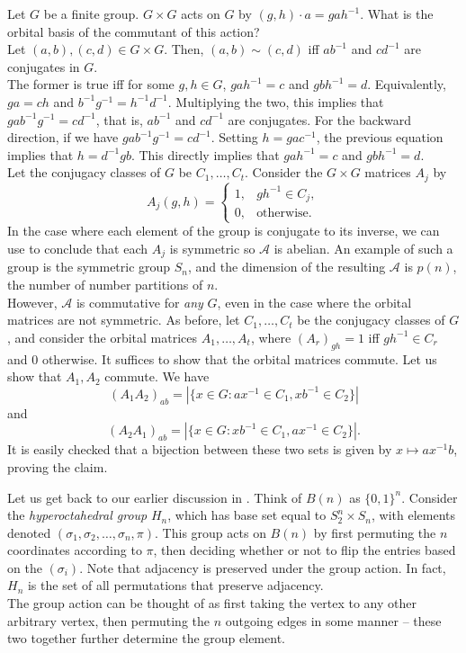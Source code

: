 	\begin{fex}
		Let $G$ be a finite group. $G \times G$ acts on $G$ by $(g,h) \cdot a = gah^{-1}$. What is the orbital basis of the commutant of this action?\\
		Let $(a,b),(c,d) \in G \times G$. Then, $(a,b) \sim (c,d)$ iff $ab^{-1}$ and $cd^{-1}$ are conjugates in $G$.\\
		The former is true iff for some $g,h \in G$, $gah^{-1} = c$ and $gbh^{-1} = d$. Equivalently, $ga = ch$ and $b^{-1}g^{-1} = h^{-1}d^{-1}$. Multiplying the two, this implies that $gab^{-1}g^{-1} = cd^{-1}$, that is, $ab^{-1}$ and $cd^{-1}$ are conjugates. For the backward direction, if we have $gab^{-1}g^{-1} = cd^{-1}$. Setting $h = gac^{-1}$, the previous equation implies that $h = d^{-1}gb$. This directly implies that $gah^{-1} = c$ and $gbh^{-1} = d$.\\
		Let the conjugacy classes of $G$ be $C_1,\ldots,C_t$. Consider the $G \times G$ matrices $A_j$ by
		\[ A_j(g,h) = \begin{cases} 1, & gh^{-1} \in C_j, \\ 0, & \text{otherwise.} \end{cases} \]
		In the case where each element of the group is conjugate to its inverse, we can use  to conclude that each $A_j$ is symmetric so $\mathcal{A}$ is abelian. An example of such a group is the symmetric group $S_n$, and the dimension of the resulting $\mathcal{A}$ is $p(n)$, the number of number partitions of $n$.\\

		However, $\mathcal{A}$ is commutative for \emph{any} $G$, even in the case where the orbital matrices are not symmetric. As before, let $C_1,\ldots,C_t$ be the conjugacy classes of $G$, and consider the orbital matrices $A_1,\ldots,A_t$, where $(A_r)_{gh} = 1$ iff $gh^{-1} \in C_r$ and $0$ otherwise. It suffices to show that the orbital matrices commute. Let us show that $A_1,A_2$ commute. We have
		\[ (A_1A_2)_{ab} = |\{x \in G : ax^{-1} \in C_1, xb^{-1} \in C_2\}| \]
		and
		\[ (A_2A_1)_{ab} = |\{x \in G : xb^{-1} \in C_1, ax^{-1} \in C_2\}|. \]
		It is easily checked that a bijection between these two sets is given by $x \mapsto ax^{-1}b$, proving the claim.
	\end{fex}

	Let us get back to our earlier discussion in . Think of $B(n)$ as $\{0,1\}^n$. Consider the \emph{hyperoctahedral group} $H_n$, which has base set equal to $S_2^n \times S_n$, with elements denoted $(\sigma_1,\sigma_2,\ldots,\sigma_n,\pi)$. This group acts on $B(n)$ by first permuting the $n$ coordinates according to $\pi$, then deciding whether or not to flip the entries based on the $(\sigma_i)$. Note that adjacency is preserved under the group action. In fact, $H_n$ is the set of all permutations that preserve adjacency.\\
	The group action can be thought of as first taking the vertex to any other arbitrary vertex, then permuting the $n$ outgoing edges in some manner -- these two together further determine the group element.\\

